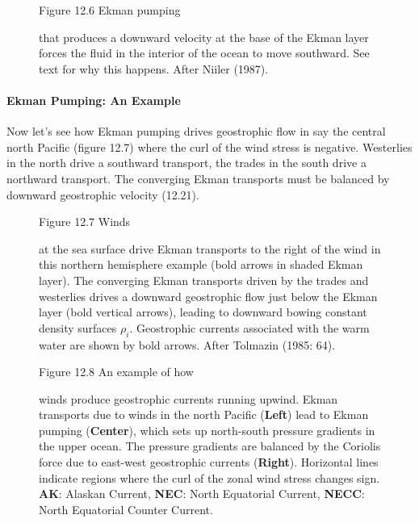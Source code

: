 \begin{figure}[t]
{}
\footnotesize
Figure 12.6  Ekman pumping \rule{0pt}{2ex} that produces a
downward velocity at the base of the Ekman layer forces the fluid in the
interior of the ocean to move southward. See text for why this happens. After Niiler (1987).

\label{fig:vorticity}
\vfill
\vspace{-3ex}
\end{figure}

\paragraph{Ekman Pumping: An Example}
Now let's see how Ekman pumping drives geostrophic
flow in say the central north Pacific (figure
12.7) where the curl of the wind stress is negative. Westerlies in
the north drive a southward transport, the trades in
the south drive a northward transport. The converging
Ekman transports must be balanced by downward geostrophic velocity (12.21).

\begin{figure}[t]
\footnotesize
Figure 12.7  Winds \rule{0pt}{5ex} at the sea surface drive Ekman transports to the right of the wind in this northern hemisphere example (bold arrows in shaded Ekman layer). The converging Ekman transports driven by the trades and westerlies drives a downward geostrophic flow just below the Ekman layer (bold vertical arrows), leading to downward bowing constant density
surfaces $\rho_i$. Geostrophic currents associated with the warm water are shown by bold arrows. After Tolmazin (1985: 64).
\label{fig:EkmanPumping}
\vspace{-4ex}
\end{figure}

\begin{figure}[b!]
\vspace{-3ex}
\footnotesize
Figure 12.8  An example of how \rule{0pt}{5ex}winds produce
geostrophic currents running upwind. Ekman transports due to winds in
the north Pacific (\textbf{Left}) lead to Ekman pumping
(\textbf{Center}), which sets up north-south pressure gradients in the upper ocean. The
pressure gradients are balanced by the Coriolis force  due to east-west geostrophic
currents (\textbf{Right}). Horizontal lines
indicate regions where the curl of the zonal wind stress changes
sign. \textbf{AK}: Alaskan Current,
\textbf{NEC}: North Equatorial Current, \textbf{NECC}: North Equatorial Counter Current.
\label{fig:zonalmeanwinds}
\vfill
\end{figure}

